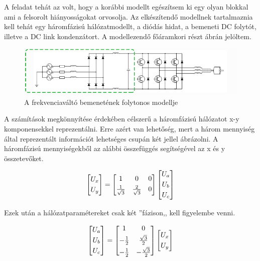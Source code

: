 A feladat tehát az volt, hogy a korábbi modellt egészítsem ki egy olyan blokkal ami a felsorolt hiányosságokat orvosolja. Az elkészítendő modellnek tartalmaznia kell tehát egy háromfázisú hálózatmodellt, a diódás hidat, a bemeneti DC folytót, illetve a DC link kondenzátort. A modellezendő főáramkori részt  ábrán jelöltem. 

\begin{figure}[H!]
	\centering
	\includegraphics[width = \textwidth]{figures/VFDschematic_choke_marked.png}
	\caption{A frekvenciaváltó bemenetének folytonos modellje} 
	\label{fig:input_marked}
\end{figure}

A számítások megkönnyítése érdekében célszerű a háromfázisú hálózatot x-y komponensekkel reprezentálni. Erre azért van lehetőség, mert a három mennyiség által reprezentált információt lehetséges csupán két jellel ábrázolni. A háromfázisú mennyiségekből az alábbi összefüggés segítségével az x és y összetevőket.

\begin{equation}
$$
\centering
\begin{bmatrix}
       U_x\\[0.3em]
       U_y 
\end{bmatrix}
=
\begin{bmatrix}
       1 & 0 & 0     \\[0.3em]
       \frac{1}{\sqrt{3}} & \frac{2}{\sqrt{3}} & 0     
\end{bmatrix}
\begin{bmatrix}
       U_a\\[0.3em]
       U_b\\[0.3em]
       U_c    
\end{bmatrix}
$$
\end{equation}

Ezek után a hálózatparamétereket csak két ''fázison,, kell figyelembe venni.  


\begin{equation}
$$
\centering
\begin{bmatrix}
       U_a\\[0.3em]
       U_b\\[0.3em]
       U_c          
\end{bmatrix}
=
\begin{bmatrix}
       1 & 0      \\[0.3em]
       -\frac{1}{2} & \frac{\sqrt{3}}{2}       \\[0.3em]
       -\frac{1}{2} & -\frac{\sqrt{3}}{2}
\end{bmatrix}
\begin{bmatrix}
       U_x\\[0.3em]
       U_y         
\end{bmatrix}
$$    
\end{equation}


